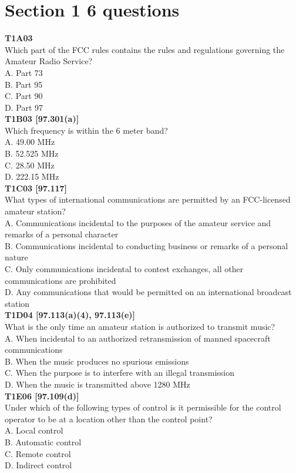 \documentclass[12pt,letterpaper,twocolumn]{report}
\author{Anthony Odenthal}
\begin{document}
\section{Section 1 6 questions}
\textbf{T1A03} \\
Which part of the FCC rules contains the rules and regulations governing the Amateur Radio Service?\\
A. Part 73\\
B. Part 95\\
C. Part 90\\
D. Part 97\\

\textbf{T1B03 [97.301(a)]}\\
Which frequency is within the 6 meter band?\\
A. 49.00 MHz\\
B. 52.525 MHz\\
C. 28.50 MHz\\
D. 222.15 MHz\\

\textbf{T1C03 [97.117]}\\
What types of international communications are permitted by an FCC-licensed amateur station?\\
A. Communications incidental to the purposes of the amateur service and remarks of a personal character\\
B. Communications incidental to conducting business or remarks of a personal nature\\
C. Only communications incidental to contest exchanges, all other communications are prohibited\\
D. Any communications that would be permitted on an international broadcast station\\

\textbf{T1D04 [97.113(a)(4), 97.113(e)]}\\
What is the only time an amateur station is authorized to transmit music?\\
A. When incidental to an authorized retransmission of manned spacecraft communications\\
B. When the music produces no spurious emissions\\
C. When the purpose is to interfere with an illegal transmission\\
D. When the music is transmitted above 1280 MHz\\

\textbf{T1E06 [97.109(d)]}\\
Under which of the following types of control is it permissible for the control operator to be at a location other than the control point?\\
A. Local control\\
B. Automatic control\\
C. Remote control\\
D. Indirect control\\
\end{document}
